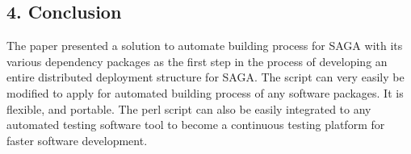 \documentclass[a4paper,10pt]{article}
\begin{document}
\begin{multicols}{2}
\section*{\normalsize 4. Conclusion}
The paper presented a solution to automate building process for SAGA with its various dependency packages as the 
first step in the process of developing an entire distributed deployment structure for SAGA. The script can very easily be modified 
to apply for automated building process of any software packages. It is flexible, and portable. The perl script can also be easily integrated to 
any automated testing software tool to become a continuous testing platform for faster software development.

%

 

\end{multicols}
\end{document}
